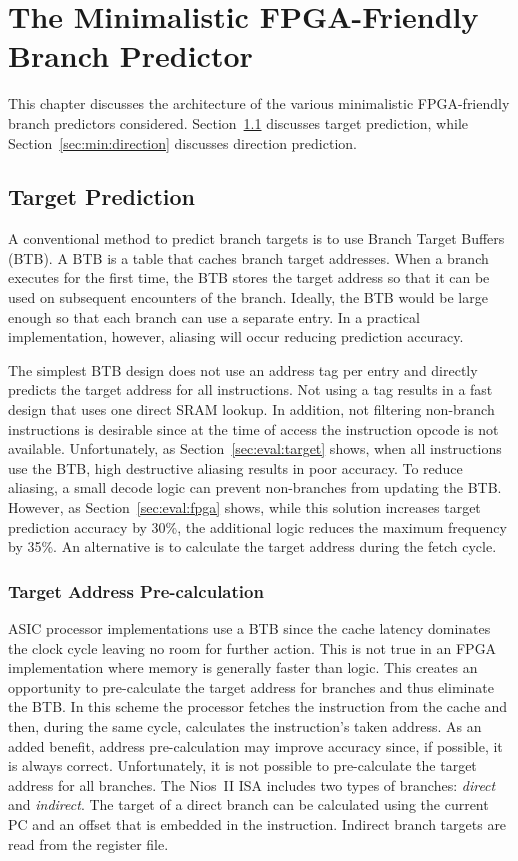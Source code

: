 \chapter{The Minimalistic FPGA-Friendly Branch Predictor}
\label{chap:minimal}
This chapter discusses the architecture of the various minimalistic FPGA-friendly branch predictors considered. Section~\ref{sec:min:target} discusses target prediction, while Section~\ref{sec:min:direction} discusses direction prediction.

\section{Target Prediction}
\label{sec:min:target}
A conventional method to predict branch targets is to use Branch Target Buffers (BTB). A BTB is a table that caches branch target addresses. When a branch executes for the first time, the BTB stores the target address so that it can be used on subsequent encounters of the branch. Ideally, the BTB would be large enough so that each branch can use a separate entry. In a practical implementation, however, aliasing will occur reducing prediction accuracy.  

The simplest BTB design does not use an address tag per entry and directly predicts the target address for all instructions. Not using a tag results in a fast design that uses one direct SRAM lookup. In addition, not filtering non-branch instructions is desirable since at the time of access the instruction opcode is not available. Unfortunately, as Section~\ref{sec:eval:target} shows, when all instructions use the BTB, high destructive aliasing results in poor accuracy. To reduce aliasing, a small decode logic can prevent non-branches from updating the BTB. However, as Section~\ref{sec:eval:fpga} shows, while this solution increases target prediction accuracy by 30\%, the additional logic reduces the maximum frequency by 35\%. An alternative is to calculate the target address during the fetch cycle.

\subsection{Target Address Pre-calculation}
\label{sec:min:target:addrprecalc}

ASIC processor implementations use a BTB since the cache latency dominates the clock cycle leaving no room for further action. This is not true in an FPGA implementation where memory is generally faster than logic. This creates an opportunity to pre-calculate the target address for branches and thus eliminate the BTB. In this scheme the processor fetches the instruction from the cache and then, during the same cycle, calculates the instruction's taken address. As an added benefit, address pre-calculation may improve accuracy since, if possible, it is always correct. Unfortunately, it is not possible to pre-calculate the target address for all branches. The Nios~II ISA includes two types of branches: \textit{direct} and \textit{indirect}. The target of a direct branch can be calculated using the current PC and an offset that is embedded in the instruction. Indirect branch targets are read from the register file.  

